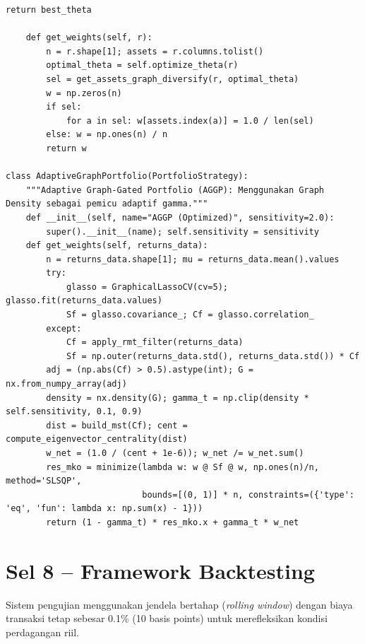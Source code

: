 \documentclass[12pt,a4paper]{article}
\begin{document}
\begin{lstlisting}[caption={Kelas-kelas strategi portofolio}]
        return best_theta

    def get_weights(self, r):
        n = r.shape[1]; assets = r.columns.tolist()
        optimal_theta = self.optimize_theta(r)
        sel = get_assets_graph_diversify(r, optimal_theta)
        w = np.zeros(n)
        if sel:
            for a in sel: w[assets.index(a)] = 1.0 / len(sel)
        else: w = np.ones(n) / n
        return w

class AdaptiveGraphPortfolio(PortfolioStrategy):
    """Adaptive Graph-Gated Portfolio (AGGP): Menggunakan Graph Density sebagai pemicu adaptif gamma."""
    def __init__(self, name="AGGP (Optimized)", sensitivity=2.0):
        super().__init__(name); self.sensitivity = sensitivity
    def get_weights(self, returns_data):
        n = returns_data.shape[1]; mu = returns_data.mean().values
        try:
            glasso = GraphicalLassoCV(cv=5); glasso.fit(returns_data.values)
            Sf = glasso.covariance_; Cf = glasso.correlation_
        except:
            Cf = apply_rmt_filter(returns_data)
            Sf = np.outer(returns_data.std(), returns_data.std()) * Cf
        adj = (np.abs(Cf) > 0.5).astype(int); G = nx.from_numpy_array(adj)
        density = nx.density(G); gamma_t = np.clip(density * self.sensitivity, 0.1, 0.9)
        dist = build_mst(Cf); cent = compute_eigenvector_centrality(dist)
        w_net = (1.0 / (cent + 1e-6)); w_net /= w_net.sum()
        res_mko = minimize(lambda w: w @ Sf @ w, np.ones(n)/n, method='SLSQP', 
                           bounds=[(0, 1)] * n, constraints=({'type': 'eq', 'fun': lambda x: np.sum(x) - 1}))
        return (1 - gamma_t) * res_mko.x + gamma_t * w_net
\end{lstlisting}

\section{Sel 8 -- Framework Backtesting}
Sistem pengujian menggunakan jendela bertahap (\textit{rolling window}) dengan biaya transaksi tetap sebesar 0.1\% (10 basis points) untuk merefleksikan kondisi perdagangan riil.
\end{document}
